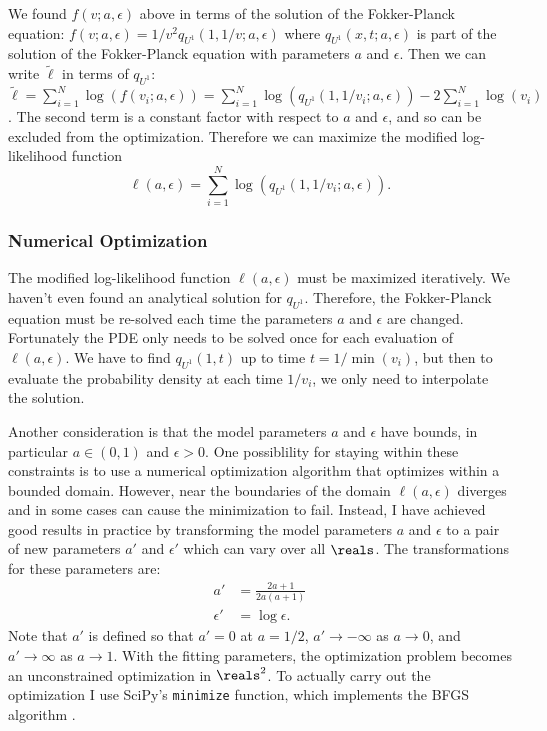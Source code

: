 We found $f(v; a, \epsilon)$ above in terms of the solution of the
Fokker-Planck equation: $f(v; a, \epsilon) = 1/v^2 q_{U^1}(1, 1/v; a,
\epsilon)$ where $q_{U^1}(x, t; a, \epsilon)$ is part of the solution
of the Fokker-Planck equation with parameters $a$ and $\epsilon$. Then
we can write $\tilde{\ell}$ in terms of $q_{U^1}$:
$\tilde{\ell} = \sum_{i=1}^N \log(f(v_i; a, \epsilon)) = \sum_{i=1}^N
\log(q_{U^1}(1, 1/v_i; a, \epsilon)) - 2\sum_{i=1}^N \log(v_i)$. The
second term is a constant factor with respect to $a$ and $\epsilon$,
and so can be excluded from the optimization. Therefore we can
maximize the modified log-likelihood function
\begin{equation}
  \label{eq:mod-log-like}
  \ell(a, \epsilon) = \sum_{i=1}^N \log(q_{U^1}(1, 1/v_i; a, \epsilon)).
\end{equation}

\subsubsection{Numerical Optimization}
\label{sec:numer-optim}

The modified log-likelihood function $\ell(a, \epsilon)$ must be
maximized iteratively. We haven't even found an analytical solution
for $q_{U^1}$. Therefore, the Fokker-Planck equation must be re-solved
each time the parameters $a$ and $\epsilon$ are changed. Fortunately
the PDE only needs to be solved once for each evaluation of
$\ell(a, \epsilon)$. We have to find $q_{U^1}(1, t)$ up to time
$t = 1/\min(v_i)$, but then to evaluate the probability density at
each time $1/v_i$, we only need to interpolate the solution.

Another consideration is that the model parameters $a$ and $\epsilon$
have bounds, in particular $a \in (0, 1)$ and $\epsilon > 0$. One
possiblility for staying within these constraints is to use a
numerical optimization algorithm that optimizes within a bounded
domain. However, near the boundaries of the domain $\ell(a, \epsilon)$
diverges and in some cases can cause the minimization to
fail. Instead, I have achieved good results in practice by
transforming the model parameters $a$ and $\epsilon$ to a pair of new
parameters $a'$ and $\epsilon'$ which can vary over all $\reals$. The
transformations for these parameters are:
\begin{align}
  \label{eq:a-fwd-trns}
  a' &= \frac{2a + 1}{2a(a + 1)} \\
  \label{eq:e-fwd-trns}
  \epsilon' &= \log \epsilon.
\end{align}
Note that $a'$ is defined so that $a'=0$ at $a=1/2$,
$a' \rightarrow -\infty$ as $a \rightarrow 0$, and
$a' \rightarrow \infty$ as $a \rightarrow 1$. With the fitting
parameters, the optimization problem becomes an unconstrained
optimization in $\reals^2$. To actually carry out the optimization I
use SciPy's \cite{Virtanen2020} \verb|minimize| function, which
implements the BFGS algorithm .

